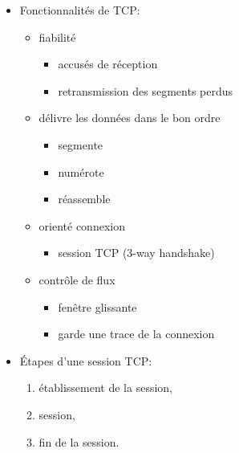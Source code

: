 \documentclass[a4paper]{article}
\begin{document}
\begin{itemize}
\item Fonctionnalités de TCP:
\begin{itemize}
    \item fiabilité
    \begin{example}
        \begin{itemize}
            \item accusés de réception
            \item retransmission des segments perdus
        \end{itemize}
    \end{example}
    \item délivre les données dans le bon ordre
    \begin{example}
        \begin{itemize}
            \item segmente
            \item numérote
            \item réassemble
        \end{itemize}
    \end{example}
    \item orienté connexion
    \begin{example}
        \begin{itemize}
            \item session TCP (3-way handshake)
        \end{itemize}
    \end{example}
    \item contrôle de flux
    \begin{example}
        \begin{itemize}
            \item fenêtre glissante
            \item garde une trace de la connexion
        \end{itemize}
    \end{example}
\end{itemize}





\item Étapes d'une session TCP:
\begin{enumerate}
    \item établissement de la session,
    \item session,
    \item fin de la session.
\end{enumerate}






\end{itemize}
\end{document}
